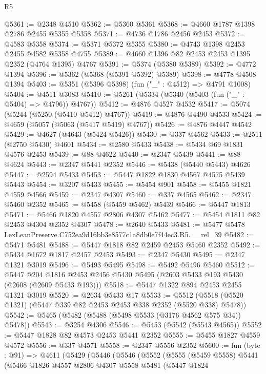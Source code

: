 \begin{lexlean}{R5}
\begin{coremodule}
@5361 := @2348 @4510
@5362 := @5360 @5361
@5368 := @4660 @1787 @1398 @2786 @2455 @5355 @5358
@5371 := @4736 @1786 @2456 @2453
@5372 := @4583 @5358
@5374 := @5371 @5372 @5355
@5380 := @4743 @1398 @2453 @2455 @4582 @5358 @4755
@5389 := @4660 @1396 @82 @2453 @2453 @1395 @2352 (@4764 @1395) @4767
@5391 := @5374 (@5380 @5389)
@5392 := @4772 @1394
@5396 := @5362 (@5368 (@5391 @5392) @5389)
@5398 := @4778 @4508 @1394
@5403 := @5351 (@5396 @5398) (fun ("_" : @4512) => @4791 @1008)
@5404 := @4511 @3083
@5410 := @5261 (@5334 (@5340 (@5403 (fun ("_" : @5404) => @4796)) @4767))
@5412 := @4876 @4527 @4532
@5417 := @5074 (@5244 (@5250 (@5410 @5412) @4767))
@5419 := @4876 @4490 @4533
@5424 := @4659 (@5057 (@5063 (@5417 @5419) @4767))
@5426 := @4876 @4447 @4542
@5429 := @4627 (@4643 (@5424 @5426))
@5430 := @337 @4562
@5433 := @2511 (@2750 @5430) @4601
@5434 := @2580 @5433
@5438 := @5434 @69 @1831 @4576 @2453
@5439 := @88 @4622
@5440 := @2347 @5439
@5441 := @88 @4624
@5443 := @2347 @5441 @2352
@5446 := @5438 (@5440 @5443) @4626
@5447 := @2594 @5433
@5453 := @5447 @1822 @1830 @4567 @4575 @5439 @5443
@5454 := @3207 @5433
@5455 := @5454 @901
@5458 := @5455 @1821 @4559 @4566
@5459 := @2347 @4307
@5460 := @337 @4565
@5462 := @2347 @5460 @2352
@5465 := @5458 (@5459 @5462) @5439
@5466 := @5447 @1813
@5471 := @5466 @1820 @4557 @2806 @4307 @5462
@5477 := @5454 @1811 @82 @2453 @4304 @2352 @4307
@5478 := @2640 @5433
@5481 := @5477 @5478 LexLeanPreserve.C752ea9d16bb3e8577c1a8db0e7f44ec3.R5.__rel_39
@5482 := @5471 @5481
@5488 := @5447 @1818 @82 @2459 @2453 @5460 @2352
@5492 := @5434 @1672 @1817 @2457 @2453
@5493 := @2347 @5430
@5495 := @2347 @1321 @3019
@5496 := @5493 @5495
@5498 := @5492 @5496 @5460
@5512 := @5447
    @204
    @1816
    @2453
    @2456
    @5430
    @5495
    (@2603 @5433 @193 @5430 (@2608 (@2609 @5433 @193)))
@5518 := @5447 @1322 @894 @2453 @2455 @1321 @3019
@5520 := @2634 @5433 @17
@5533 := @5512 (@5518 (@5520 @1321) (@5447 @339 @82 @2453 @2453 @338 @2352 (@5520 @338) @5478))
@5542 := @5465 (@5482 (@5488 (@5498 @5533 (@3176 @4562 @575 @34)) @5478))
@5543 := @3254 @4306
@5546 := @5453 (@5542 (@5543 @4565))
@5552 := @5447 @1828 @82 @4573 @2453 @5441 @2352
@5555 := @5455 @1827 @4559 @4572
@5556 := @337 @4571
@5558 := @2347 @5556 @2352
@5600 := fun (byte : @91) =>
  @4611
    (@5429
      (@5446
        (@5546
          (@5552
            (@5555
              (@5459 @5558)
              @5441
              (@5466
                @1826
                @4557
                @2806
                @4307
                @5558
                @5481
                (@5447
                  @1824

\end{coremodule}
\end{lexlean}
